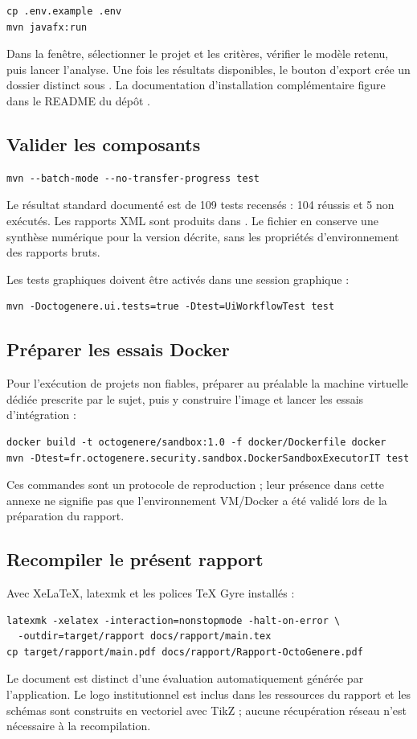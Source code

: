 \begin{lstlisting}
cp .env.example .env
mvn javafx:run
\end{lstlisting}

Dans la fenêtre, sélectionner le projet et les critères, vérifier le modèle retenu, puis lancer l'analyse. Une fois les résultats disponibles, le bouton d'export crée un dossier distinct sous . La documentation d'installation complémentaire figure dans le README du dépôt \cite{depot}.

\subsection*{Valider les composants}
\begin{lstlisting}
mvn --batch-mode --no-transfer-progress test
\end{lstlisting}
Le résultat standard documenté est de 109 tests recensés : 104 réussis et 5 non exécutés. Les rapports XML sont produits dans . Le fichier  en conserve une synthèse numérique pour la version décrite, sans les propriétés d'environnement des rapports bruts.

Les tests graphiques doivent être activés dans une session graphique :
\begin{lstlisting}
mvn -Doctogenere.ui.tests=true -Dtest=UiWorkflowTest test
\end{lstlisting}

\subsection*{Préparer les essais Docker}
Pour l'exécution de projets non fiables, préparer au préalable la machine virtuelle dédiée prescrite par le sujet, puis y construire l'image et lancer les essais d'intégration :
\begin{lstlisting}
docker build -t octogenere/sandbox:1.0 -f docker/Dockerfile docker
mvn -Dtest=fr.octogenere.security.sandbox.DockerSandboxExecutorIT test
\end{lstlisting}
Ces commandes sont un protocole de reproduction ; leur présence dans cette annexe ne signifie pas que l'environnement VM/Docker a été validé lors de la préparation du rapport.

\subsection*{Recompiler le présent rapport}
Avec XeLaTeX, latexmk et les polices TeX Gyre installés :
\begin{lstlisting}
latexmk -xelatex -interaction=nonstopmode -halt-on-error \
  -outdir=target/rapport docs/rapport/main.tex
cp target/rapport/main.pdf docs/rapport/Rapport-OctoGenere.pdf
\end{lstlisting}
Le document est distinct d'une évaluation automatiquement générée par l'application. Le logo institutionnel est inclus dans les ressources du rapport et les schémas sont construits en vectoriel avec TikZ ; aucune récupération réseau n'est nécessaire à la recompilation.

